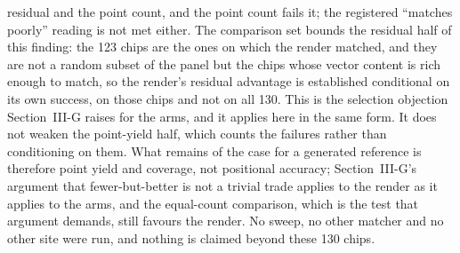 residual and the point count, and the point count fails it; the registered ``matches
poorly'' reading is not met either. The comparison set bounds the residual half of this finding: the 123 chips are the ones on which the render matched, and they are not a random subset of
the panel but the chips whose vector content is rich enough to match, so the render's
residual advantage is established conditional on its own success, on those chips and not
on all 130. This is the selection objection Section~III-G raises for the arms, and it
applies here in the same form. It does not weaken the point-yield half, which counts the
failures rather than conditioning on them. What remains of the case for a generated
reference is therefore point yield and coverage, not positional accuracy; Section~III-G's argument that
fewer-but-better is not a trivial trade applies to the render as it applies to the arms,
and the equal-count comparison, which is the test that argument demands, still favours the
render. No sweep, no other matcher and no other site were run, and nothing is claimed
beyond these 130 chips.

